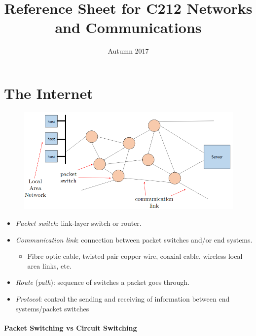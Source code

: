 \documentclass[twocolumn,english]{article}
\begin{document}
\title{Reference Sheet for C212 Networks and Communications}

\date{Autumn 2017}
\maketitle

\section{The Internet}

\begin{figure}[H]
\centering{}\includegraphics[width=0.75\linewidth]{img/internet}
\end{figure}

\begin{itemize}
\item \emph{Packet switch}: link-layer switch or router.
\item \emph{Communication link}: connection between packet switches and/or
end systems.
\begin{itemize}
\item Fibre optic cable, twisted pair copper wire, coaxial cable, wireless
local area links, etc.
\end{itemize}
\item \emph{Route} (\emph{path}): sequence of switches a packet goes through.
\item \emph{Protocol}: control the sending and receiving of information
between end systems/packet switches
\end{itemize}

\paragraph{Packet Switching vs Circuit Switching}
\end{document}
